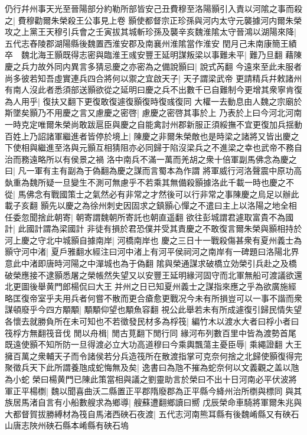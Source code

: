 仍行幷州事天光至晉陽部分約勒所部皆安己丑費穆至洛陽顥引入責以河隂之事而殺之|{
	費穆勸爾朱榮殺王公事見上卷}
顥使都督宗正珍孫與河内太守元襲據河内爾朱榮攻之上黨王天穆引兵會之壬寅拔其城斬珍孫及襲辛亥魏淮隂太守晉鴻以湖陽來降|{
	五代志舂陵郡湖陽縣後魏置西淮安郡及南襄州淮隂當作淮安}
閏月己未南康簡王績卒　魏北海王顥既得志密與臨淮王彧安豐王延明謀叛梁以事難未平|{
	難乃旦翻}
藉陳慶之兵力故外同内異言多猜忌慶之亦密為之備說顥曰|{
	說式芮翻}
今遠來至此未服者尚多彼若知吾虛實連兵四合將何以禦之宜啟天子|{
	天子謂梁武帝}
更請精兵幷敕諸州有南人沒此者悉須部送顥欲從之延明曰慶之兵不出數千已自難制今更增其衆寧肯復為人用乎|{
	復扶又翻下更復敢復遽復顥復時復彧復同}
大權一去動息由人魏之宗廟於斯墜矣顥乃不用慶之言又慮慶之密啓|{
	慮慶之密啓其事於上}
乃表於上曰今河北河南一時克定唯爾朱榮尚敢跋扈臣與慶之自能禽討州郡新服正須綏撫不宜更復加兵揺動百姓上乃詔諸軍繼進者皆停於境上|{
	陳慶之非爾朱榮敵也是時梁之諸將又皆出慶之下使相與繼進至洛與元顥互相猜阻亦必同歸于陷沒梁兵之不進梁之幸也武帝不務自治而務遠略所以有侯景之禍}
洛中南兵不滿一萬而羌胡之衆十倍軍副馬佛念為慶之曰|{
	凡一軍有主有副為于偽翻為慶之謀而言蜀本為作謂}
將軍威行河洛聲震中原功高埶重為魏所疑一旦變生不測可無慮乎不若乘其無備殺顥據洛此千載一時也慶之不從|{
	馬佛念有戰國策士之氣然必有非常之才然後可以行非常之事陳慶之烏足以辦此載子亥翻}
顥先以慶之為徐州刺史因固求之鎮顥心憚之不遣曰主上以洛陽之地全相任委忽聞捨此朝寄|{
	朝寄謂魏朝所寄託也朝直遥翻}
欲往彭城謂君遽取富貴不為國計|{
	此國計謂為梁國計}
非徒有損於君恐僕并受其責慶之不敢復言爾朱榮與顥相持於河上慶之守北中城顥自據南岸|{
	河橋南岸也}
慶之三日十一戰殺傷甚衆有夏州義士為顥守河中渚|{
	夏戶雅翻水經注曰河中渚上有河平侯祠河之南岸有一碑題曰洛陽北界意此中渚即唐時河陽之中潬城也為于偽翻}
隂與榮通謀求破橋立効榮引兵赴之及橋破榮應接不逮顥悉屠之榮帳然失望又以安豐王延明緣河固守而北軍無船可渡議欲還北更圖後舉黄門郎楊侃曰大王并州之日已知夏州義士之謀指來應之乎為欲廣施經略匡復帝室乎夫用兵者何嘗不散而更合瘡愈更戰况今未有所損豈可以一事不諧而衆謀頓廢乎今四方顒顒|{
	顒顒仰望也顒魚容翻}
視公此舉若未有所成遽復引歸民情失望各懷去就勝負所在未可知也不若徵發民材多為桴筏|{
	編竹木以渡水大者曰桴小者曰筏桴方無翻筏音伐}
閒以舟楫|{
	閒古莧翻下閒行同}
緣河布列數百里中皆為渡勢首尾既遠使顥不知所防一旦得渡必立大功高道穆曰今乘輿飄蕩主憂臣辱|{
	乘繩證翻}
大王擁百萬之衆輔天子而令諸侯若分兵造筏所在散渡指掌可克奈何捨之北歸使顥復得完聚徵兵天下此所謂養虺成蛇悔無及矣|{
	逸書曰為虺不摧為蛇奈何以文義觀之盖以虺為小蛇}
榮曰楊黄門已陳此策當相與議之劉靈助言於榮曰不出十日河南必平伏波將軍正平楊檦|{
	魏以聞喜曲沃二縣置正平郡隋廢郡為正平縣今絳州治所檦與標同}
與其族居馬渚自言有小船數艘求為鄉導|{
	艘蘇遭翻鄉讀曰嚮}
戊辰榮命車騎將軍爾朱兆與大都督賀拔勝縛材為筏自馬渚西硤石夜渡|{
	五代志河南熊耳縣有後魏崤縣又有硤石山唐志陜州硤石縣本崤縣有硤石塢}
